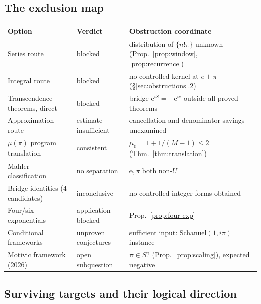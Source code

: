 \documentclass[11pt]{amsart}
\theoremstyle{definition}
\theoremstyle{remark}
\numberwithin{equation}{section}
\newcommand{\irr}{\mu}
\newcommand{\ee}{\mathrm{e}}
\begin{document}
\subsection{The exclusion map}

\begin{center}
\small\begin{tabularx}{\textwidth}{@{}p{}p{}X@{}}
\toprule
Option & Verdict & Obstruction coordinate \\
\midrule
Series route & blocked & distribution of $\{n!\pi\}$ unknown (Prop.~\ref{prop:window}, \ref{prop:recurrence}) \\
Integral route & blocked & no controlled kernel at $e+\pi$ (\S\ref{sec:obstructions}.2) \\
Transcendence theorems, direct & blocked & bridge $\ee^{iS}=-\ee^{ie}$ outside all proved theorems \\
Approximation route & estimate insufficient & cancellation and denominator savings unexamined \\
$\irr(\pi)$ program translation & consistent & $\irr_0=1+1/(M-1)\le2$ (Thm.~\ref{thm:translation}) \\
Mahler classification & no separation & $\ee,\pi$ both non-$U$ \\
Bridge identities (4 candidates) & inconclusive & no controlled integer forms obtained \\
Four/six exponentials & application blocked & Prop.~\ref{prop:four-exp} \\
Conditional frameworks & unproven conjectures & sufficient input: Schanuel$(1,i\pi)$ instance \\
Motivic framework (2026) & open subquestion & $\pi\in S$? (Prop.~\ref{prop:scaling}), expected negative \\
\bottomrule
\end{tabularx}
\end{center}

\subsection{Surviving targets and their logical direction}
\end{document}
